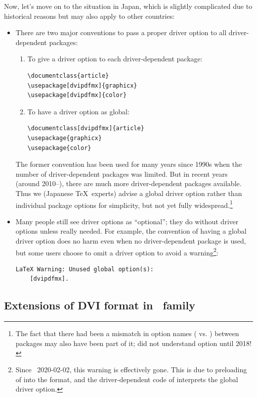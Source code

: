\documentclass[a4paper,11pt,dvipdfmx]{article}
\begin{document}
Now, let's move on to the situation in Japan,
which is slightly complicated due to historical reasons
but may also apply to other countries:
\begin{itemize}
  \item There are two major conventions to pass a proper driver option
    to all driver-dependent packages:
    \begin{enumerate}
      \item To give a driver option to each driver-dependent package:
\begin{verbatim}
\documentclass{article}
\usepackage[dvipdfmx]{graphicx}
\usepackage[dvipdfmx]{color}
\end{verbatim}
      \item To have a driver option as global:
\begin{verbatim}
\documentclass[dvipdfmx]{article}
\usepackage{graphicx}
\usepackage{color}
\end{verbatim}
    \end{enumerate}
    The former convention has been used for many years since 1990s
    when the number of driver-dependent packages was limited.
    But in recent years (around 2010--), there are much more
    driver-dependent packages available. Thus
    we (Japanese \TeX\ experts) advise a global driver option
    rather than individual package options for simplicity,
    but not yet fully widespread.\footnote{The fact that
    there had been a mismatch in option names
    (\code{[dvipdfm]} vs. \code{[dvipdfmx]})
    between packages may also have been part of it;
     did not understand \code{[dvipdfmx]} option until 2018!}
  \item Many people still see driver options as ``optional'';
    they do without driver options unless really needed.
    For example, the convention of having a global driver option
    does no harm even when no driver-dependent package is used, but
    some users choose to omit a driver option to avoid a warning\footnote{%
    Since \LaTeXe~2020-02-02, this warning is effectively gone. This is due
    to preloading of  into the format, and the driver-dependent
    code of  interprets the global driver option.}:
\begin{verbatim}
LaTeX Warning: Unused global option(s):
    [dvipdfmx].
\end{verbatim}
\end{itemize}

\subsection{Extensions of DVI format in \pTeX\ family}
\end{document}
